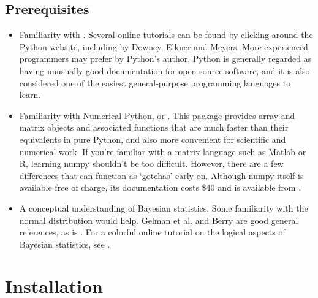\documentclass{manual}
\begin{document}
\section{Prerequisites}\label{sec:prerequisites}
\begin{itemize}
    \item Familiarity with . Several online tutorials can be found by clicking around the Python website, including  by Downey, Elkner and Meyers. More experienced programmers may prefer  by Python's author. Python is generally regarded as having unusually good documentation for open-source software, and it is also considered one of the easiest general-purpose programming languages to learn.
    \item Familiarity with Numerical Python, or . This package provides array and matrix objects and associated functions that are much faster than their equivalents in pure Python, and also more convenient for scientific and numerical work. If you're familiar with a matrix language such as Matlab or R, learning numpy shouldn't be too difficult. However, there are a few differences that can function as `gotchas' early on. Although numpy itself is available free of charge, its documentation costs \$40 and is available from .
    \item A conceptual understanding of Bayesian statistics. Some familiarity with the normal distribution would help. Gelman et al. \cite{gelman} and Berry \cite{berry} are good general references, as is . For a colorful online tutorial on the logical aspects of Bayesian statistics, see .
\end{itemize}



\chapter{Installation}\label{cha:installation} %
\end{document}

